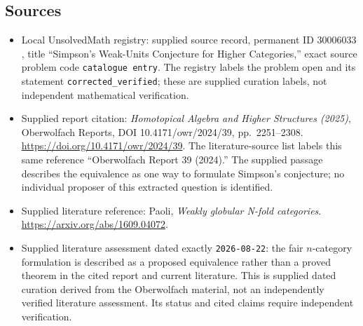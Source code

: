 \documentclass[11pt]{article}
\begin{document}
\subsection{Sources}
\begin{itemize}
\item Local UnsolvedMath registry: supplied source record, permanent ID \(30006033\), title ``Simpson's Weak-Units Conjecture for Higher Categories,'' exact source problem code \texttt{catalogue entry}. The registry labels the problem open and its statement \texttt{corrected\_verified}; these are supplied curation labels, not independent mathematical verification.
\item Supplied report citation: \emph{Homotopical Algebra and Higher Structures (2025)}, Oberwolfach Reports, DOI 10.4171/owr/2024/39, pp.\ 2251--2308. \url{https://doi.org/10.4171/owr/2024/39}. The literature-source list labels this same reference ``Oberwolfach Report 39 (2024).'' The supplied passage describes the equivalence as one way to formulate Simpson's conjecture; no individual proposer of this extracted question is identified.
\item Supplied literature reference: Paoli, \emph{Weakly globular N-fold categories}. \url{https://arxiv.org/abs/1609.04072}.
\item Supplied literature assessment dated exactly \texttt{2026-08-22}: the fair \(n\)-category formulation is described as a proposed equivalence rather than a proved theorem in the cited report and current literature. This is supplied dated curation derived from the Oberwolfach material, not an independently verified literature assessment. Its status and cited claims require independent verification.
\end{itemize}
\end{document}
